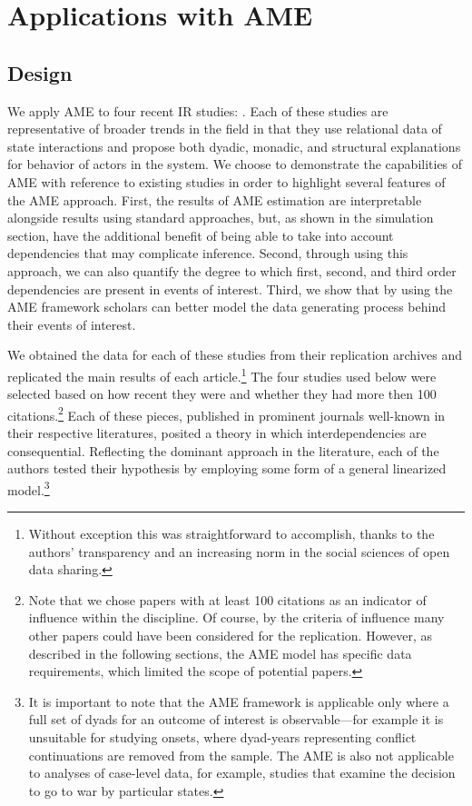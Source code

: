 \section{\textbf{Applications with AME}}

\subsection{Design}

We apply AME to four recent IR studies: \citet{reiter:stam:2003, mcdonald:2004,  weeks:2012, gibler:2017}. Each of these studies are representative of broader trends in the field in that they use relational data of state interactions and propose both dyadic, monadic, and structural explanations for behavior of actors in the system. We choose to demonstrate the capabilities of AME with reference to existing studies in order to highlight several features of the AME approach. First, the results of AME estimation are interpretable alongside results using standard approaches, but, as shown in the simulation section, have the additional benefit of being able to take into account dependencies that may complicate inference. Second, through using this approach, we can also quantify the degree to which first, second, and third order dependencies are present in events of interest. Third, we show that by using the AME framework scholars can better model the data generating process behind their events of interest.

We obtained the data for each of these studies from their replication archives and replicated the main results of each article.\footnote{Without exception this was straightforward to accomplish, thanks to the authors' transparency and an increasing norm in the social sciences of open data sharing.} The four studies used below were selected based on how recent they were and whether they had more then 100 citations.\footnote{Note that we chose papers with at least 100 citations as an indicator of influence within the discipline. Of course, by the criteria of influence many other papers could have been considered for the replication. However, as described in the following sections, the AME model has specific data requirements, which limited the scope of potential papers.} Each of these pieces, published in prominent journals well-known in their respective literatures, posited a theory in which interdependencies are consequential. Reflecting the dominant approach in the literature, each of the authors tested their hypothesis by employing some form of a general linearized model.\footnote{It is important to note that the AME framework is applicable only where a full set of dyads for an outcome of interest is observable---for example it is unsuitable for studying onsets, where dyad-years representing conflict continuations are removed from the sample. The AME is also not applicable to analyses of case-level data, for example, studies that examine the decision to go to war by particular states.}

